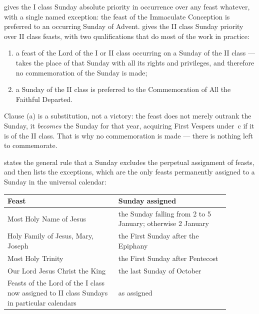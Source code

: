  gives the I class Sunday absolute priority in occurrence over any feast whatever, with a
single named exception: the feast of the Immaculate Conception is preferred to an occurring
Sunday of Advent.  gives the II class Sunday priority over II class feasts, with two
qualifications that do most of the work in practice:

\begin{enumerate}[label=(\alph*), leftmargin=1.7em, itemsep=0.25em]
\item a feast of the Lord of the I or II class occurring on a Sunday of the II class
 — takes the place of
that Sunday with all its rights and privileges, and therefore no commemoration of the Sunday is
made;
\item a Sunday of the II class is preferred to the Commemoration of All the Faithful Departed.
\end{enumerate}

Clause (a) is a substitution, not a victory: the feast does not merely outrank the Sunday, it
\emph{becomes} the Sunday for that year, acquiring First Vespers under \,c if it is of
the II class. That is why no commemoration is made — there is nothing left to commemorate.

 states the general rule that a Sunday excludes the perpetual assignment of feasts, and
then lists the exceptions, which are the only feasts permanently assigned to a Sunday in the
universal calendar:

\begin{center}
\small
\begin{tabular}{@{}>{\raggedright\arraybackslash}p{0.44\linewidth}>{\raggedright\arraybackslash}p{0.44\linewidth}@{}}
\toprule
\textbf{Feast} & \textbf{Sunday assigned} \\
\midrule
Most Holy Name of Jesus & the Sunday falling from 2 to 5 January; otherwise 2 January \\
Holy Family of Jesus, Mary, Joseph & the First Sunday after the Epiphany \\
Most Holy Trinity & the First Sunday after Pentecost \\
Our Lord Jesus Christ the King & the last Sunday of October \\
Feasts of the Lord of the I class now assigned to II class Sundays in particular calendars & as assigned \\
\bottomrule
\end{tabular}
\end{center}

